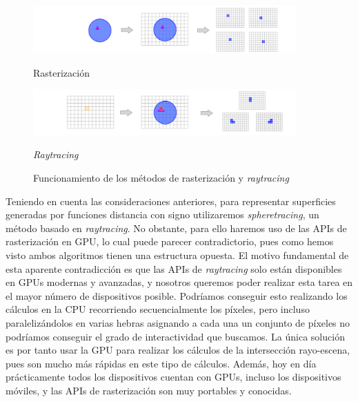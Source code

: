 \begin{figure}[!ht]
     \begin{minipage}[c]{0.98\linewidth}
        \centering
        \includegraphics[width=0.9\textwidth]{Plantilla-TFG-master/img/rasterizacion.png}
        \caption{Rasterización}
     \end{minipage}
     \begin{minipage}[c]{0.98\linewidth}
        \centering
        \includegraphics[width=0.9\textwidth]{Plantilla-TFG-master/img/raytracing.png}
        \caption{\textit{Raytracing}}
     \end{minipage}
     \caption{Funcionamiento de los métodos de rasterización y \textit{raytracing}}
     \label{fig:colorPixels}
\end{figure}

Teniendo en cuenta las consideraciones anteriores, para representar superficies generadas por funciones distancia con signo  utilizaremos \textit{spheretracing}, un método basado en \textit{raytracing}. No obstante, para ello haremos uso de las APIs de rasterización en GPU, lo cual puede parecer contradictorio, pues como hemos visto ambos algoritmos tienen una estructura opuesta. El motivo fundamental de esta aparente contradicción es que las APIs de \textit{raytracing} solo están disponibles en GPUs modernas y avanzadas, y nosotros queremos poder realizar esta tarea en el mayor número de dispositivos posible. Podríamos conseguir esto realizando los cálculos en la CPU recorriendo secuencialmente los píxeles, pero incluso paralelizándolos en varias hebras asignando a cada una un conjunto de píxeles no podríamos conseguir el grado de interactividad que buscamos. La única solución es por tanto usar la GPU para realizar los cálculos de la intersección rayo-escena, pues son mucho más rápidas en este tipo de cálculos. Además, hoy en día prácticamente todos los dispositivos cuentan con GPUs, incluso los dispositivos móviles, y las APIs de rasterización son muy portables y conocidas. \newline

